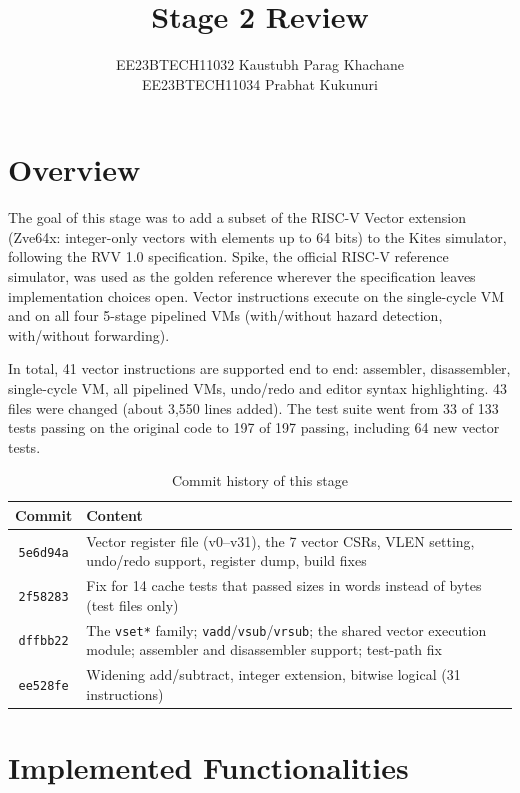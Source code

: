 \documentclass{article}
\title{Stage 2 Review}
\author{EE23BTECH11032 Kaustubh Parag Khachane \\
EE23BTECH11034 Prabhat Kukunuri}
\date{}
\begin{document}
\maketitle

\section*{Overview}
The goal of this stage was to add a subset of the RISC-V Vector extension (Zve64x: integer-only
vectors with elements up to 64 bits) to the Kites simulator, following the RVV 1.0
specification. Spike, the official RISC-V reference simulator, was used as the golden reference
wherever the specification leaves implementation choices open. Vector instructions execute on the
single-cycle VM and on all four 5-stage pipelined VMs (with/without hazard detection, with/without
forwarding).

In total, 41 vector instructions are supported end to end: assembler, disassembler, single-cycle
VM, all pipelined VMs, undo/redo and editor syntax highlighting. 43 files were changed
(about 3,550 lines added). The test suite went from 33 of 133 tests passing on the original code
to 197 of 197 passing, including 64 new vector tests.

\begin{table}[h]
\centering
\begin{tabular}{|c|p{12cm}|}
    \hline
    \textbf{Commit} & \textbf{Content} \\
    \hline
    \texttt{5e6d94a} & Vector register file (v0--v31), the 7 vector CSRs, VLEN setting, undo/redo
    support, register dump, build fixes \\
    \hline
    \texttt{2f58283} & Fix for 14 cache tests that passed sizes in words instead of bytes (test files
    only) \\
    \hline
    \texttt{dffbb22} & The \texttt{vset*} family; \texttt{vadd}/\texttt{vsub}/\texttt{vrsub}; the
    shared vector execution module; assembler and disassembler support; test-path fix \\
    \hline
    \texttt{ee528fe} & Widening add/subtract, integer extension, bitwise logical (31 instructions) \\
    \hline
\end{tabular}
\caption{Commit history of this stage}
\label{tab:commits}
\end{table}

\section*{Implemented Functionalities}
\end{document}
